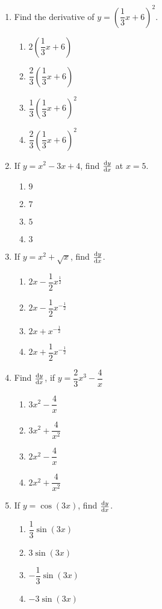 \begin{multicols}{2}
\begin{enumerate}[label={\arabic*.}]
\item Find the derivative of \(y ={\left(\dfrac{1}{3}x + 6\right)}^{2}\).
	\begin{enumerate}[label={\Alph*.}]
	\item \(2{\left(\dfrac{1}{3}x + 6\right)}\)
	\item \(\dfrac{2}{3}{\left(\dfrac{1}{3}x + 6\right)}\)
	\item \(\dfrac{1}{3}{\left(\dfrac{1}{3}x + 6\right)}^{2}\)
	\item \(\dfrac{2}{3}{\left(\dfrac{1}{3}x + 6\right)}^{2}\)
	\end{enumerate}
\item If \(y = {x}^{2}-3{x}+4\), find \(\dv{y}{x}\) at \(x = 5\).
	\begin{enumerate}[label={\Alph*.}]
	\item \(9\)
	\item \(7\)
	\item \(5\)
	\item \(3\)
	\end{enumerate}
\item If  \(y = {x}^{2}+\sqrt{x}\), find \(\dv{y}{x}\).
	\begin{enumerate}[label={\Alph*.}]
	\item \(2x-\dfrac{1}{2}x^{\frac{1}{2}}\)
	\item \(2x-\dfrac{1}{2}x^{-{\frac{1}{2}}}\)
	\item \(2x+x^{-{\frac{1}{2}}}\)
	\item \(2x+\dfrac{1}{2}x^{-{\frac{1}{2}}}\)
	\end{enumerate}
\item Find \(\dv{y}{x}\), if \(y = \dfrac{2}{3}{x}^{3}-\dfrac{4}{x}\)
	\begin{enumerate}[label={\Alph*.}]
	\item \({3}{x}^{2}-\dfrac{4}{x}\)
	\item \({3}{x}^{2}+\dfrac{4}{x^{2}}\)
	\item \({2}{x}^{2}-\dfrac{4}{x}\)
	\item \({2}{x}^{2}+\dfrac{4}{x^{2}}\)
	\end{enumerate}
\item If \(y = \cos{(3x)}\), find \(\dv{y}{x}\).
	\begin{enumerate}[label={\Alph*.}]
	\item \(\dfrac{1}{3}\sin{(3x)}\)
	\item \({3}\sin{(3x)}\)
	\item \(-{\dfrac{1}{3}}\sin{(3x)}\)
	\item \(-3\sin{(3x)}\)

\end{enumerate}
\end{enumerate}
\end{multicols}
